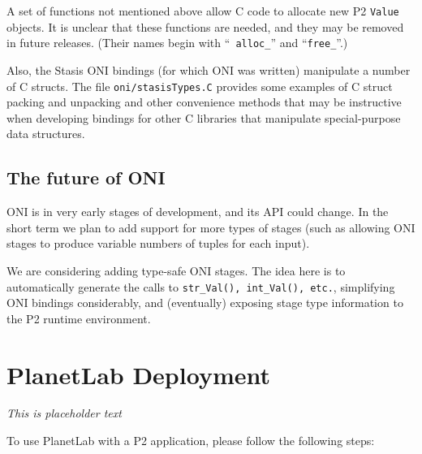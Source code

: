 \documentclass{article}
\begin{document}
A set of functions not mentioned above allow C code to allocate new P2
{\tt Value} objects.  It is unclear that these functions are needed, and
they may be removed in future releases. (Their names begin with ``{\tt
  alloc\_}'' and ``{\tt free\_}''.)  

Also, the Stasis ONI bindings (for which ONI was written) manipulate a
number of C structs.  The file {\tt oni/stasisTypes.C} provides some
examples of C struct packing and unpacking and other convenience
methods that may be instructive when developing \ol bindings for
other C libraries that manipulate special-purpose data structures.

\subsection{The future of ONI}

ONI is in very early stages of development, and its API could change.
In the short term we plan to add support for more types of stages
(such as allowing ONI stages to produce variable numbers of tuples for
each input).

We are considering adding type-safe ONI stages.  The idea here is to
automatically generate the calls to {\tt str\_Val(), int\_Val(),
  etc.}, simplifying ONI bindings considerably, and (eventually)
exposing stage type information to the P2 runtime environment.

\section{PlanetLab Deployment}
\emph{This is placeholder text}

To use PlanetLab with a P2 application, please follow the following steps:
\end{document}
